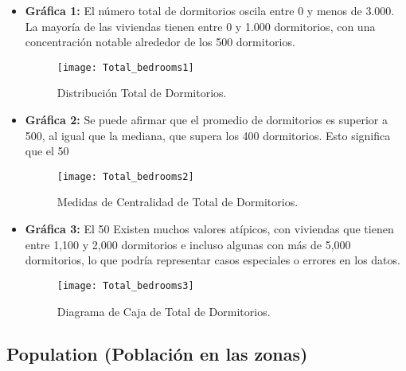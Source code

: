 \documentclass[a4paper, 10pt]{article}
\begin{document}
\begin{itemize}
    \item \textbf{Gráfica 1:} El número total de dormitorios oscila entre 0 y menos de 3.000. La mayoría de las viviendas tienen entre 0 y 1.000 dormitorios, con una concentración notable alrededor de los 500 dormitorios.
    \begin{figure}[H]
        \centering
        \texttt{[image: Total\_bedrooms1]}
        \caption{Distribución Total de Dormitorios.}
    \end{figure}

    \item \textbf{Gráfica 2:} Se puede afirmar que el promedio de dormitorios es superior a 500, al igual que la mediana, que supera los 400 dormitorios. Esto significa que el 50%
    \begin{figure}[H]
        \centering
        \texttt{[image: Total\_bedrooms2]}
        \caption{Medidas de Centralidad de Total de Dormitorios.}
    \end{figure}

    \item \textbf{Gráfica 3:} El 50%
    Existen muchos valores atípicos, con viviendas que tienen entre 1,100 y 2,000 dormitorios e incluso algunas con más de 5,000 dormitorios, lo que podría representar casos especiales o errores en los datos.

    \begin{figure}[H]
        \centering
        \texttt{[image: Total\_bedrooms3]}
        \caption{Diagrama de Caja de Total de Dormitorios.}
    \end{figure}
\end{itemize} 

\subsection{Population (Población en las zonas)}
\end{document}
